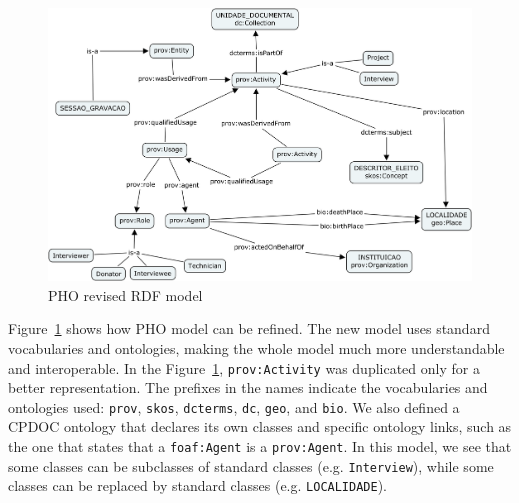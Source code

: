 \begin{figure}[htbp]
  \centering
  \includegraphics[width=.8\textwidth]{pho-new.png}
  \caption{PHO revised RDF model}\label{fig:pho-new}
\end{figure}

Figure~\ref{fig:pho-new} shows how PHO model can be refined. The new
model uses standard vocabularies and ontologies, making the whole
model much more understandable and interoperable. In the
Figure~\ref{fig:pho-new}, \texttt{prov:Activity} was duplicated only
for a better representation. The prefixes in the names indicate the
vocabularies and ontologies used: \texttt{prov}, \texttt{skos},
\texttt{dcterms}, \texttt{dc}, \texttt{geo}, and \texttt{bio}. We also
defined a CPDOC ontology that declares its own classes and specific
ontology links, such as the one that states that a \texttt{foaf:Agent} is
a \texttt{prov:Agent}. In this model, we see that some classes can be subclasses of standard
classes (e.g. \texttt{Interview}), while some classes can be replaced by standard
classes (e.g. \texttt{LOCALIDADE}). 

